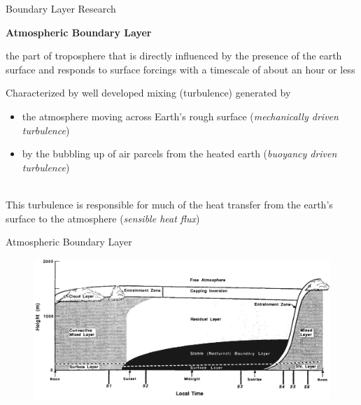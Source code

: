 \begin{frame}{Boundary Layer Research}

{\large \textbf{Atmospheric Boundary Layer}}
\begin{fancydefs}
	the part of troposphere that is directly influenced
	by the presence of the earth surface and responds
	to surface forcings with a timescale of about an
	hour or less
\end{fancydefs}

Characterized by well developed mixing (turbulence) generated by
\begin{itemize}
	\item the atmosphere moving across Earth’s rough surface (\textit{mechanically driven turbulence})
	\item by the bubbling up of air parcels from the heated earth (\textit{buoyancy driven turbulence})
\end{itemize}
~\\
This turbulence is responsible for much of the heat transfer from the earth's surface to the atmosphere (\textit{sensible heat flux})
\end{frame}

\begin{frame}{Atmospheric Boundary Layer}

\begin{figure}
	\includegraphics[width=1\textwidth]{abl1.png}
\end{figure}
\end{frame}

